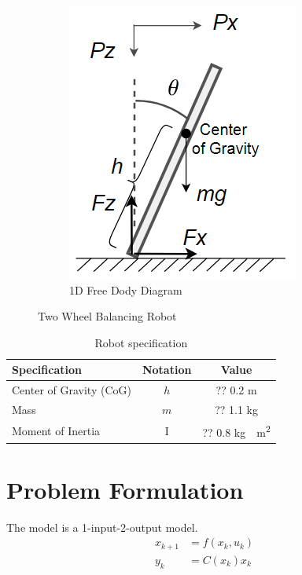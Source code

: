 \documentclass[12pt]{article}
\begin{document}
\begin{figure}
\begin{subfigure}{0.3\textwidth}
\includegraphics[width=\linewidth]{./figures/free_body_diagram.png}
\caption{1D Free Dody Diagram} \label{fig_1d_free_body_diagram}
\end{subfigure}
\caption{Two Wheel Balancing Robot} \label{fig_robots}
\end{figure}


\begin{table}
  \centering
  \begin{tabular}{l|c|c}
    \hline
	Specification & Notation & Value \\ \hline
    Center of Gravity (CoG) & $h$ & ?? 0.2 m \\ 
	Mass & $m$ & ?? 1.1 kg \\ 
	Moment of Inertia & I & ?? 0.8 \si{\kilogram\cdot\meter^2} \\ \hline
  \end{tabular}
  \caption{Robot specification} 
  \label{tab_robot_specification}
\end{table}


\section{Problem Formulation}
The model is a 1-input-2-output model.
\begin{align}
\label{equ_orig_nonlinear_dynamics}
x_{k+1} & = f(x_k, u_k) \\
y_k & = C(x_k)x_k
\end{align}
\end{document}
